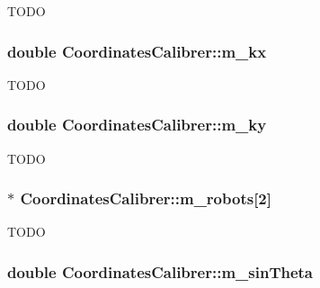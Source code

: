 \label{classCoordinatesCalibrer_a2d3543afab02c87d0e06861d064bd265}
TODO \hypertarget{classCoordinatesCalibrer_a337af708f5dc1bfca0d191b988d8ab49}{
\subsubsection[{m\_\-kx}]{\setlength{\rightskip}{0pt plus 5cm}double {\bf CoordinatesCalibrer::m\_\-kx}}}
\label{classCoordinatesCalibrer_a337af708f5dc1bfca0d191b988d8ab49}
TODO \hypertarget{classCoordinatesCalibrer_a10648b2ef70a9ad0fd874e04f3b4d488}{
\subsubsection[{m\_\-ky}]{\setlength{\rightskip}{0pt plus 5cm}double {\bf CoordinatesCalibrer::m\_\-ky}}}
\label{classCoordinatesCalibrer_a10648b2ef70a9ad0fd874e04f3b4d488}
TODO \hypertarget{classCoordinatesCalibrer_aebcdb5e598d2af268ab93a0271c245b6}{
\subsubsection[{m\_\-robots}]{$\ast$ {\bf CoordinatesCalibrer::m\_\-robots}\mbox{[}2\mbox{]}}}
\label{classCoordinatesCalibrer_aebcdb5e598d2af268ab93a0271c245b6}
TODO \hypertarget{classCoordinatesCalibrer_af2675b7f9f8612eb53e81a5268501180}{
\subsubsection[{m\_\-sinTheta}]{\setlength{\rightskip}{0pt plus 5cm}double {\bf CoordinatesCalibrer::m\_\-sinTheta}}}
